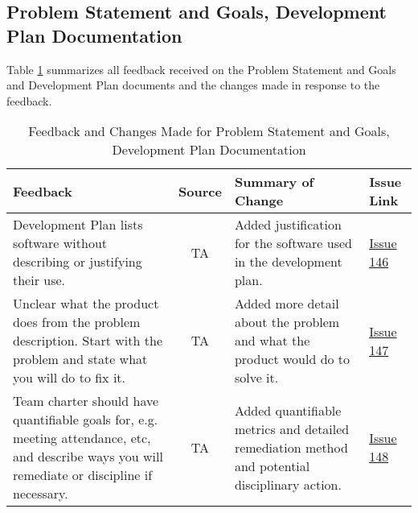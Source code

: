 \documentclass{article}
\begin{document}



\subsection{Problem Statement and Goals, Development Plan Documentation}
Table \ref{table:PSGDV} summarizes all feedback received on the Problem
Statement and Goals and Development Plan documents and the changes made in
response to the feedback.
\begin{table}[H]
\centering
\begin{tabularx}{\textwidth}{|X|c|X|p{1cm}|}
    \hline
    \textbf{Feedback} & \textbf{Source} & \textbf{Summary of Change} &
    \textbf{Issue Link} \\
    \hline
    Development Plan lists software without describing or justifying their use.
    & TA & Added justification for the software used in the development plan. &
    \href{https://github.com/SumanyaG/Alkalytics/issues/146}{Issue 146} \\
    \hline
    Unclear what the product does from the problem description. Start with the
    problem and state what you will do to fix it. & TA & Added more detail about
    the problem and what the product would do to solve it. &
    \href{https://github.com/SumanyaG/Alkalytics/issues/147}{Issue 147} \\
    \hline
    Team charter should have quantifiable goals for, e.g. meeting attendance,
    etc, and describe ways you will remediate or discipline if necessary. & TA &
    Added quantifiable metrics and detailed remediation method and potential
    disciplinary action. &
    \href{https://github.com/SumanyaG/Alkalytics/issues/148}{Issue 148} \\
    \hline
\end{tabularx}
\caption{Feedback and Changes Made for Problem Statement and Goals, Development Plan Documentation}
\label{table:PSGDV}
\end{table}
\end{document}

